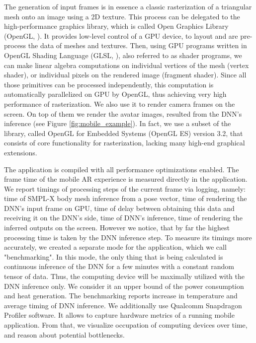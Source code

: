 The generation of input frames is in essence a classic rasterization of a triangular mesh onto an image using a 2D texture. This process can be delegated to the high-performance graphics library, which is called Open Graphics Library (OpenGL, \cite{aux:opengl22}). It provides low-level control of a GPU device, to layout and are pre-process the data of meshes and textures. Then, using GPU programs written in OpenGL Shading Language (GLSL, \cite{aux:glsl21}), also referred to as shader programs, we can make linear algebra computations on individual vertices of the mesh (vertex shader), or individual pixels on the rendered image (fragment shader). Since all those primitives can be processed independently, this computation is automatically parallelized on GPU by OpenGL, thus achieving very high performance of rasterization. We also use it to render camera frames on the screen. On top of them we render the avatar images, resulted from the DNN's inference (see Figure \ref{fig:mobile_example}). In fact, we use a subset of the library, called OpenGL for Embedded Systems (OpenGL ES) version 3.2, that consists of core functionality for rasterization, lacking many high-end graphical extensions.

The application is compiled with all performance optimizations enabled. The frame time of the mobile AR experience is measured directly in the application. We report timings of processing steps of the current frame via logging, namely: time of SMPL-X body mesh inference from a pose vector, time of rendering the DNN's input frame on GPU, time of delay between obtaining this data and receiving it on the DNN's side, time of DNN's inference, time of rendering the inferred outputs on the screen. However we notice, that by far the highest processing time is taken by the DNN inference step. To measure its timings more accurately, we created a separate mode for the application, which we call "benchmarking". In this mode, the only thing that is being calculated is continuous inference of the DNN for a few minutes with a constant random tensor of data. Thus, the computing device will be maximally utilized with the DNN inference only. We consider it an upper bound of the power consumption and heat generation. The benchmarking reports increase in temperature and average timing of DNN inference. We additionally use Qualcomm Snapdragon Profiler software. It allows to capture hardware metrics of a running mobile application. From that, we visualize occupation of computing devices over time, and reason about potential bottlenecks.

